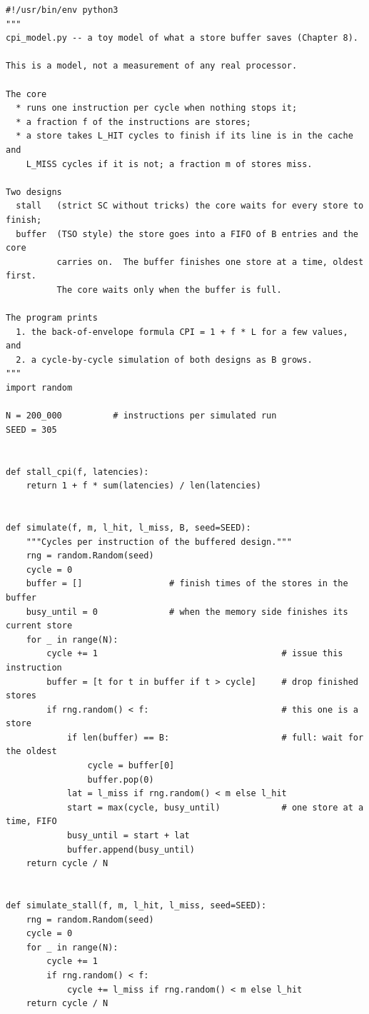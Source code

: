\begin{lstlisting}[style=vspython]
#!/usr/bin/env python3
"""
cpi_model.py -- a toy model of what a store buffer saves (Chapter 8).

This is a model, not a measurement of any real processor.

The core
  * runs one instruction per cycle when nothing stops it;
  * a fraction f of the instructions are stores;
  * a store takes L_HIT cycles to finish if its line is in the cache and
    L_MISS cycles if it is not; a fraction m of stores miss.

Two designs
  stall   (strict SC without tricks) the core waits for every store to finish;
  buffer  (TSO style) the store goes into a FIFO of B entries and the core
          carries on.  The buffer finishes one store at a time, oldest first.
          The core waits only when the buffer is full.

The program prints
  1. the back-of-envelope formula CPI = 1 + f * L for a few values, and
  2. a cycle-by-cycle simulation of both designs as B grows.
"""
import random

N = 200_000          # instructions per simulated run
SEED = 305


def stall_cpi(f, latencies):
    return 1 + f * sum(latencies) / len(latencies)


def simulate(f, m, l_hit, l_miss, B, seed=SEED):
    """Cycles per instruction of the buffered design."""
    rng = random.Random(seed)
    cycle = 0
    buffer = []                 # finish times of the stores in the buffer
    busy_until = 0              # when the memory side finishes its current store
    for _ in range(N):
        cycle += 1                                    # issue this instruction
        buffer = [t for t in buffer if t > cycle]     # drop finished stores
        if rng.random() < f:                          # this one is a store
            if len(buffer) == B:                      # full: wait for the oldest
                cycle = buffer[0]
                buffer.pop(0)
            lat = l_miss if rng.random() < m else l_hit
            start = max(cycle, busy_until)            # one store at a time, FIFO
            busy_until = start + lat
            buffer.append(busy_until)
    return cycle / N


def simulate_stall(f, m, l_hit, l_miss, seed=SEED):
    rng = random.Random(seed)
    cycle = 0
    for _ in range(N):
        cycle += 1
        if rng.random() < f:
            cycle += l_miss if rng.random() < m else l_hit
    return cycle / N



\end{lstlisting}
